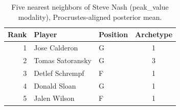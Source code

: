 \begin{table}[htbp]
  \centering\small
  \begin{tabular}{rllc}
    \toprule
    Rank & Player & Position & Archetype \\
    \midrule
    1 & Jose Calderon & G & 1 \\
    2 & Tomas Satoransky & G & 3 \\
    3 & Detlef Schrempf & F & 1 \\
    4 & Donald Sloan & G & 1 \\
    5 & Jalen Wilson & F & 1 \\
    \bottomrule
  \end{tabular}
  \caption{Five nearest neighbors of Steve Nash (peak_value modality), Procrustes-aligned posterior mean.}
  \label{tab:Steve_Nash_neighbors_peak_value}
\end{table}


